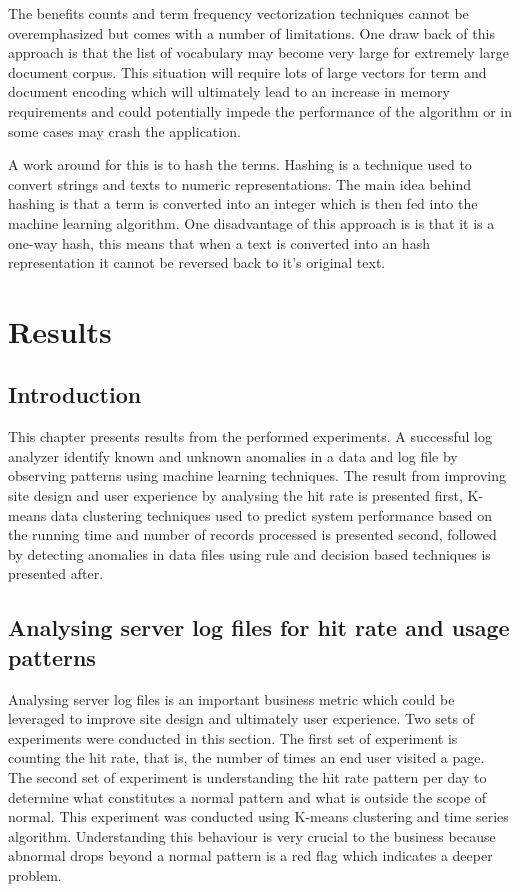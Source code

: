 \documentclass[12pt, letterpaper, titlepage]{report}
\begin{document}
The benefits counts and term frequency vectorization techniques cannot be overemphasized but comes with a number of limitations. One draw back of this approach is that the list of vocabulary may become very large for extremely large document corpus. This situation will require lots of large vectors for term and document encoding which will ultimately lead to an increase in memory requirements and could potentially impede the performance of the algorithm or in some cases may crash the application.

A work around for this is to hash the terms. Hashing is a technique used to convert strings and texts to numeric representations. The main idea behind hashing is that a term is converted into an integer  which is then fed into the machine learning algorithm. One disadvantage of this approach is is that it is a one-way hash, this means that when a text is converted into an hash representation it cannot be reversed back to it’s original text.


\chapter{Results}

\section{Introduction}
This chapter presents results from the performed experiments. A successful log analyzer identify known and unknown anomalies in a data and log file by observing patterns using machine learning techniques.  The result from improving site design and user experience by analysing the hit rate is presented first, K-means data clustering techniques used to predict system performance based on the running time and number of records processed is presented second, followed by detecting anomalies in data files using rule and decision based techniques is presented after.

\section{Analysing server log files for hit rate and usage patterns}
Analysing server log files is an important business metric which could be leveraged to improve site design and ultimately user experience. Two sets of experiments were conducted in this section. The first set of experiment is counting the hit rate, that is, the number of times an end user visited a page. The second set of experiment is understanding the hit rate pattern per day to determine what constitutes a normal pattern and what is outside the scope of normal. This experiment was conducted using K-means clustering and time series algorithm. Understanding this behaviour is very crucial to the business because abnormal drops beyond a normal pattern is a red flag which indicates a deeper problem.
\end{document}
